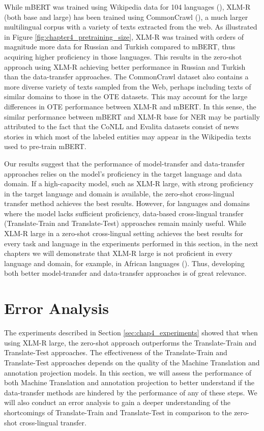 While mBERT was trained using Wikipedia data for 104 languages (\cite{devlin-etal-2019-bert}), XLM-R (both base and large) has been trained using CommonCrawl (\cite{conneau-etal-2020-unsupervised}), a much larger multilingual corpus with a variety of texts extracted from the web. As illustrated in Figure \ref{fig:chapter4_pretraining_size}, XLM-R was trained with orders of magnitude more data for Russian and Turkish compared to mBERT, thus acquiring higher proficiency in those languages. This results in the zero-shot approach using XLM-R achieving better performance in Russian and Turkish than the data-transfer approaches. The CommonCrawl dataset also contains a more diverse variety of texts sampled from the Web, perhaps including texts of similar domains to those in the OTE datasets. This may account for the large differences in OTE performance between XLM-R and mBERT. In this sense, the similar performance between mBERT and XLM-R base for NER may be partially attributed to the fact that the CoNLL and Evalita datasets consist of news stories in which most of the labeled entities may appear in the Wikipedia texts used to pre-train mBERT.

Our results suggest that the performance of model-transfer and data-transfer approaches relies on the model's proficiency in the target language and data domain.  If a high-capacity model, such as XLM-R large, with strong proficiency in the target language and domain is available, the zero-shot cross-lingual transfer method achieves the best results. However, for languages and domains where the model lacks sufficient proficiency, data-based cross-lingual transfer (Translate-Train and Translate-Test) approaches remain mainly useful. While XLM-R large in a zero-shot cross-lingual setting achieves the best results for every task and language in the experiments performed in this section, in the next chapters we will demonstrate that XLM-R large is not proficient in every language and domain, for example, in African languages (\cite{adelani-etal-2022-masakhaner}). Thus, developing both better model-transfer and data-transfer approaches is of great relevance.


\section{Error Analysis}
The experiments described in Section \ref{sec:chap4_experiments} showed that when using XLM-R large, the zero-shot approach outperforms the Translate-Train and Translate-Test approaches. The effectiveness of the Translate-Train and Translate-Test approaches depends on the quality of the Machine Translation and annotation projection models. In this section, we will assess the performance of both Machine Translation and annotation projection to better understand if the data-transfer methods are hindered by the performance of any of these steps. We will also conduct an error analysis to gain a deeper understanding of the shortcomings of Translate-Train and Translate-Test in comparison to the zero-shot cross-lingual transfer.


